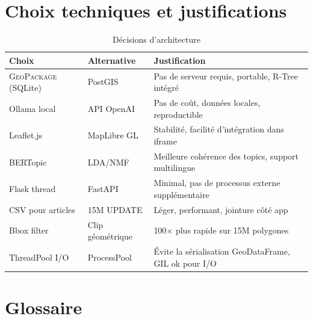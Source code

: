 \documentclass[12pt,a4paper]{report}
\newcommand{\gpkg}{\textsc{GeoPackage}}
\begin{document}
 

\section{Choix techniques et justifications}

\begin{table}[H]
\centering
\begin{tabular}{p{4cm}p{4cm}p{5cm}}
\toprule
\textbf{Choix} & \textbf{Alternative} & \textbf{Justification} \\
\midrule
\gpkg{} (SQLite) & PostGIS & Pas de serveur requis, portable, R-Tree intégré \\
Ollama local & API OpenAI & Pas de coût, données locales, reproductible \\
Leaflet.js & MapLibre GL & Stabilité, facilité d'intégration dans iframe \\
BERTopic & LDA/NMF & Meilleure cohérence des topics, support multilingue \\
Flask thread & FastAPI & Minimal, pas de processus externe supplémentaire \\
CSV pour articles & 15M UPDATE & Léger, performant, jointure côté app \\
Bbox filter & Clip géométrique & 100× plus rapide sur 15M polygones \\
ThreadPool I/O & ProcessPool & Évite la sérialisation GeoDataFrame, GIL ok pour I/O \\
\bottomrule
\end{tabular}
\caption{Décisions d'architecture}
\end{table}

\section{Glossaire}
\end{document}
